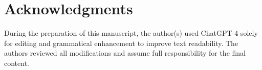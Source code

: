 \documentclass[conference]{IEEEtran}
\begin{document}
\section*{Acknowledgments}
During the preparation of this manuscript, the author(s) used ChatGPT-4 solely for editing and grammatical enhancement to improve text readability. The authors reviewed all modifications and assume full responsibility for the final content.



\end{document}
